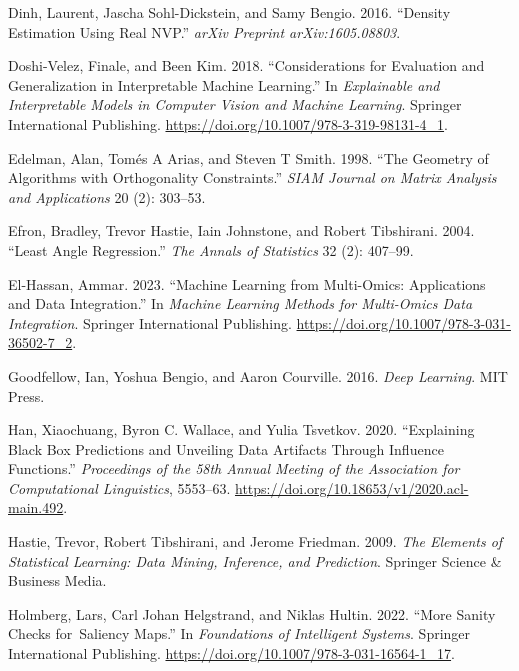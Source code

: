 \documentclass[
  letterpaper,
]{report}
\newlength{\cslhangindent}
\newenvironment{CSLReferences}[2] %
 {\begin{list}{}{%
  \setlength{\itemindent}{0pt}
  \setlength{\leftmargin}{0pt}
  \setlength{\parsep}{0pt}
  \ifodd #1
   \setlength{\leftmargin}{\cslhangindent}
   \setlength{\itemindent}{-1\cslhangindent}
  \fi
  \setlength{\itemsep}{#2\baselineskip}}}
 {\end{list}}
\begin{document}
\begin{CSLReferences}{1}{1}
Dinh, Laurent, Jascha Sohl-Dickstein, and Samy Bengio. 2016. {``Density
Estimation Using Real NVP.''} \emph{arXiv Preprint arXiv:1605.08803}.

Doshi-Velez, Finale, and Been Kim. 2018. {``Considerations for
Evaluation and Generalization in Interpretable Machine Learning.''} In
\emph{Explainable and Interpretable Models in Computer Vision and
Machine Learning}. Springer International Publishing.
\url{https://doi.org/10.1007/978-3-319-98131-4_1}.

Edelman, Alan, Tomés A Arias, and Steven T Smith. 1998. {``The Geometry
of Algorithms with Orthogonality Constraints.''} \emph{SIAM Journal on
Matrix Analysis and Applications} 20 (2): 303--53.

Efron, Bradley, Trevor Hastie, Iain Johnstone, and Robert Tibshirani.
2004. {``Least Angle Regression.''} \emph{The Annals of Statistics} 32
(2): 407--99.

El-Hassan, Ammar. 2023. {``Machine Learning from Multi-Omics:
Applications and Data Integration.''} In \emph{Machine Learning Methods
for Multi-Omics Data Integration}. Springer International Publishing.
\url{https://doi.org/10.1007/978-3-031-36502-7_2}.

Goodfellow, Ian, Yoshua Bengio, and Aaron Courville. 2016. \emph{Deep
Learning}. MIT Press.

Han, Xiaochuang, Byron C. Wallace, and Yulia Tsvetkov. 2020.
{``Explaining Black Box Predictions and Unveiling Data Artifacts Through
Influence Functions.''} \emph{Proceedings of the 58th Annual Meeting of
the Association for Computational Linguistics}, 5553--63.
\url{https://doi.org/10.18653/v1/2020.acl-main.492}.

Hastie, Trevor, Robert Tibshirani, and Jerome Friedman. 2009. \emph{The
Elements of Statistical Learning: Data Mining, Inference, and
Prediction}. Springer Science \& Business Media.

Holmberg, Lars, Carl Johan Helgstrand, and Niklas Hultin. 2022. {``More
Sanity Checks for~Saliency Maps.''} In \emph{Foundations of Intelligent
Systems}. Springer International Publishing.
\url{https://doi.org/10.1007/978-3-031-16564-1_17}.


\end{CSLReferences}
\end{document}
